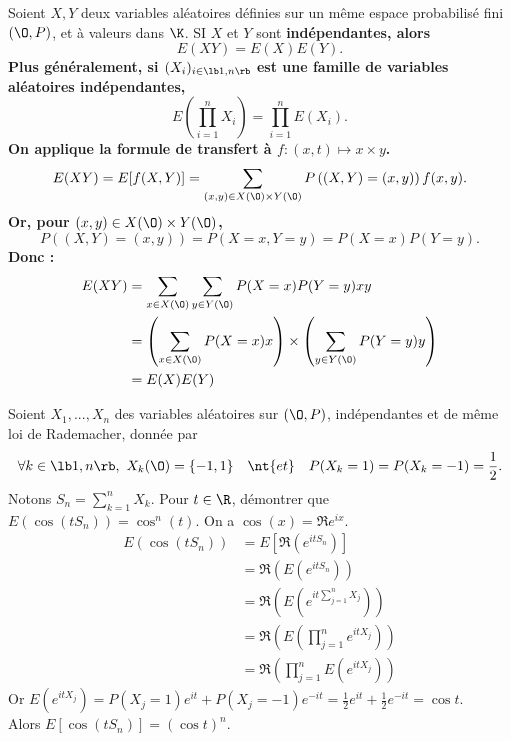 \documentclass[11pt]{article}
\begin{document}
\begin{thm}{}{}
    Soient $X,Y$ deux variables aléatoires définies sur un même espace probabilisé fini $(\O,P)$, et à valeurs dans $\K$. SI $X$ et $Y$ sont \bf{indépendantes}, alors
    \begin{equation*}
        E(XY)=E(X)E(Y).
    \end{equation*}
    Plus généralement, si $(X_i)_{i\in\lb1,n\rb}$ est une famille de variables aléatoires \bf{indépendantes},
    \begin{equation*}
        E\left( \prod_{i=1}^nX_i \right) = \prod_{i=1}^nE(X_i).
    \end{equation*}
    \tcblower
    On applique la formule de transfert à $f:(x,t)\mapsto x\times y$.
    \begin{equation*}
        E(XY)=E[f(X,Y)]=\sum_{(x,y)\in X(\O)\times Y(\O)}P\left( (X,Y)=(x,y) \right)f(x,y).
    \end{equation*}
    Or, pour $(x,y)\in X(\O) \times Y(\O)$,
    \begin{equation*}
        P\left( (X,Y) = (x,y) \right) = P(X=x,Y=y) = P(X=x)P(Y=y).
    \end{equation*}
    Donc :
    \begin{align*}
        E(XY) &= \sum_{x\in X(\O)}\sum_{y\in Y(\O)}P(X=x)P(Y=y)xy\\
        &= \left( \sum_{x\in X(\O)} P(X=x)x \right)\times\left( \sum_{y\in Y(\O)} P(Y=y)y \right)\\
        &=E(X)E(Y)
    \end{align*}
\end{thm}

\begin{ex}{}{}
    Soient $X_1,...,X_n$ des variables aléatoires sur $(\O,P)$, indépendantes et de même loi de Rademacher, donnée par
    \begin{equation*}
        \forall k \in \lb1,n\rb, ~ X_k(\O)=\{-1,1\} \quad \nt{et} \quad P(X_k=1)=P(X_k=-1)=\frac{1}{2}.
    \end{equation*}
    Notons $S_n=\sum_{k=1}^nX_k$. Pour $t\in\R$, démontrer que $E(\cos(tS_n))=\cos^n(t)$.
    \tcblower
    On a $\cos(x)=\Re{e^{ix}}$.
    \begin{align*}
        E(\cos(tS_n)) &= E\left[ \Re(e^{itS_n}) \right]\\
        &= \Re(E(e^{itS_n}))\\
        &= \Re\left( E\left(e^{it\sum_{j=1}^nX_j}\right) \right)\\
        &= \Re\left( E\left( \prod_{j=1}^ne^{itX_j} \right) \right)\\
        &= \Re\left(\prod_{j=1}^nE(e^{itX_j})\right)
    \end{align*}
    Or $E(e^{itX_j})=P(X_j=1)e^{it}+P(X_j=-1)e^{-it}=\frac{1}{2}e^{it}+\frac{1}{2}e^{-it}=\cos t$.\\
    Alors $E\left[ \cos(tS_n) \right]=\left( \cos t \right)^n$.
\end{ex}
\end{document}
